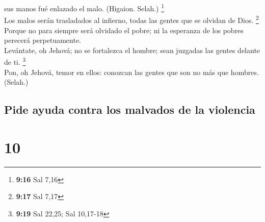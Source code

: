 sus manos fué enlazado el malo. (Higaion. Selah.) \footnote{\textbf{9:16}
  Sal 7,16}\\
 Los malos serán trasladados al infierno, todas las gentes
que se olvidan de Dios. \footnote{\textbf{9:17} Sal 7,17}\\
 Porque no para siempre será olvidado el pobre; ni la
esperanza de los pobres perecerá perpetuamente.\\
 Levántate, oh Jehová; no se fortalezca el hombre; sean
juzgadas las gentes delante de ti. \footnote{\textbf{9:19} Sal 22,25;
  Sal 10,17-18}\\
 Pon, oh Jehová, temor en ellos: conozcan las gentes que
son no más que hombres. (Selah.)

\hypertarget{pide-ayuda-contra-los-malvados-de-la-violencia}{%
\subsection{Pide ayuda contra los malvados de la
violencia}\label{pide-ayuda-contra-los-malvados-de-la-violencia}}

\hypertarget{section-9}{%
\section{10}\label{section-9}}


